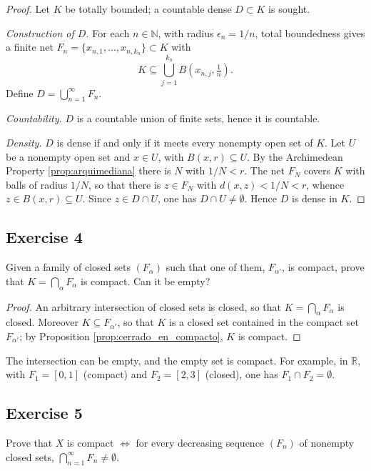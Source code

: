 \documentclass[11pt, a4paper]{article}
\begin{document}
\begin{proof}
Let $K$ be totally bounded; a countable dense $D \subset K$ is sought.

\textit{Construction of $D$.} For each $n \in \mathbb{N}$, with radius $\epsilon_n = 1/n$,
total boundedness gives a finite net $F_n = \{x_{n,1}, \dots, x_{n,k_n}\} \subset K$ with
$$ K \subseteq \bigcup_{j=1}^{k_n} B\!\left(x_{n,j}, \tfrac{1}{n}\right). $$
Define $D = \bigcup_{n=1}^{\infty} F_n$.

\textit{Countability.} $D$ is a countable union of finite sets, hence it is countable.

\textit{Density.} $D$ is dense if and only if it meets every nonempty open set of $K$. Let $U$ be a nonempty
open set and $x \in U$, with $B(x, r) \subseteq U$. By the Archimedean Property \ref{prop:arquimediana}
there is $N$ with $1/N < r$.
The net $F_N$ covers $K$ with balls of radius $1/N$, so that there is $z \in F_N$ with $d(x, z) < 1/N < r$,
whence $z \in B(x, r) \subseteq U$. Since $z \in D \cap U$, one has $D \cap U \neq \emptyset$. Hence
$D$ is dense in $K$.
\end{proof}

\subsection*{Exercise 4}

Given a family of closed sets $(F_{\alpha})$ such that one of them, $F_{\alpha'}$, is compact,
prove that $K = \bigcap_{\alpha} F_{\alpha}$ is compact. Can it be empty?

\begin{proof}
An arbitrary intersection of closed sets is closed, so that $K = \bigcap_\alpha F_\alpha$ is closed.
Moreover $K \subseteq F_{\alpha'}$, so that $K$ is a closed set contained in the compact set
$F_{\alpha'}$; by Proposition \ref{prop:cerrado_en_compacto}, $K$ is compact.
\end{proof}

The intersection can be empty, and the empty set is compact. For example, in $\mathbb{R}$, with
$F_1 = [0, 1]$ (compact) and $F_2 = [2, 3]$ (closed), one has $F_1 \cap F_2 = \emptyset$.

\subsection*{Exercise 5}

Prove that $X$ is compact $\iff$ for every decreasing sequence $(F_n)$ of nonempty closed sets,
$\bigcap_{n=1}^{\infty} F_n \neq \emptyset$.
\end{document}
